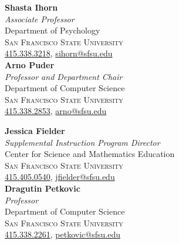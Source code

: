 \documentclass[hidelinks, 10pt]{article}
\def\contentwidth{0.9\linewidth}    %
\begin{document}
{\begin{minipage}[ct]{\contentwidth}
    \begin{multicols}{2}
        \textbf{Shasta Ihorn}\\
        \emph{Associate Professor}\\
        {Department of Psychology}\\
        \textsc{San Francisco State University}\\
        \href{tel:4153383218}{415.338.3218}, \href{mailto:sihorn@sfsu.edu}{sihorn@sfsu.edu}\\

        \textbf{Arno Puder}\\
        \emph{Professor and Department Chair}\\
        {Department of Computer Science}\\
        \textsc{San Francisco State University}\\
        \href{tel:4153382853}{415.338.2853}, \href{mailto:arno@sfsu.edu}{arno@sfsu.edu}\\
    \end{multicols}
\end{minipage}

\begin{minipage}[ct]{\contentwidth}
    \begin{multicols}{2}
        \textbf{Jessica Fielder}\\
        \emph{Supplemental Instruction Program Director}\\
        {Center for Science and Mathematics Education}\\
        \textsc{San Francisco State University}\\
        \href{tel:4154050540}{415.405.0540}, \href{mailto:jfielder@sfsu.edu}{jfielder@sfsu.edu}\\

        \textbf{Dragutin Petkovic}\\
        \emph{Professor}\\
        {Department of Computer Science}\\
        \textsc{San Francisco State University}\\
        \href{tel:4153382261}{415.338.2261}, \href{mailto:petkovic@sfsu.edu}{petkovic@sfsu.edu}\\
    \end{multicols}
\end{minipage}


}
\end{document}
